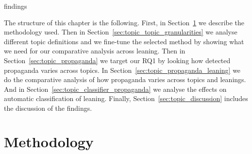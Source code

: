 



findings

The structure of this chapter is the following. First, in Section~\ref{sec:topic_method} we describe the methodology used. Then in Section~\ref{sec:topic_topic_granularities} we analyse different topic definitions and we fine-tune the selected method by showing what we need for our comparative analysis across leaning. Then in Section~\ref{sec:topic_propaganda} we target our RQ1 by looking how detected propaganda varies across topics. In Section~\ref{sec:topic_propaganda_leaning} we do the comparative analysis of how propaganda varies across topics and leanings. And in Section~\ref{sec:topic_classifier_propaganda} we analyse the effects on automatic classification of leaning.
Finally, Section~\ref{sec:topic_discussion} includes the discussion of the findings.







\section{\statusorange Methodology}
\label{sec:topic_method}

